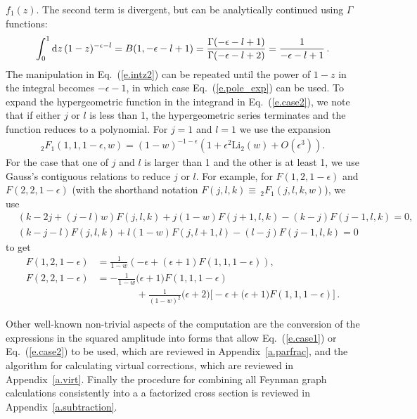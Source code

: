 \documentclass[prd,preprintnumbers,nofootinbib,superscriptaddress,onecolumn,preprint]{revtex4-1}
\newcommand\3[1]{\boldsymbol{#1}}
\newcommand{\eref}[1]{Eq.~(\ref{e.#1})}
\newcommand{\aref}[1]{Appendix~\ref{a.#1}}
\begin{document}
\begin{itemize}
	$f_1(z)$. The second term is divergent, but can be analytically
	continued using $\Gamma$ functions:
	\begin{align}
	\int_0^1\di{z} (1-z)^{-\epsilon-l}=B(1,-\epsilon-l+1)
	=\frac{\Gamma(-\epsilon-l+1)}
	{\Gamma(-\epsilon-l+2)}=\frac{1}{-\epsilon-l+1} \, .
	\end{align}
	The manipulation in \eref{intz2} can be repeated until the power of
	$1-z$ in the integral becomes $-\epsilon-1$, in which case
	\eref{pole_exp} can be used. To expand the hypergeometric function in
	the integrand in \eref{case2}, we note that if either $j$ or $l$ is
	less than 1, the hypergeometric series terminates and the function
	reduces to a polynomial. For $j=1$ and $l=1$ we use the expansion
	\begin{align}
	_2F_1(1,1,1-\epsilon,w)=(1-w)^{-1-\epsilon}(1+\epsilon^2 \text{Li}_2(w)+O(\epsilon^3)).
	\end{align}
	For the case that one of $j$ and $l$ is larger than 1 and the other
	is at least 1, we use Gauss's contiguous relations to reduce $j$ or
	$l$.  For example, for $F(1,2,1-\epsilon)$ and $F(2,2,1-\epsilon)$
	(with the shorthand notation $F(j,l,k)\equiv \,_2F_1(j,l,k,w)$), we use
	\begin{align}
	&(k-2j+(j-l)w)F(j,l,k)+j(1-w)F(j+1,l,k)-(k-j)F(j-1,l,k)=0, \\
	&(k-j-l)F(j,l,k)+l(1-w)F(j,l+1,l)-(l-j)F(j-1,l,k)=0 
	\end{align}
	to get
	\begin{align}
	F(1,2,1-\epsilon)&=\frac{1}{1-w}\left
	(-\epsilon+\left ( \epsilon+1\right
	)F(1,1,1-\epsilon)  \right ), \\
	F(2,2,1-\epsilon)&= -\frac{1}{1-w}\biggl (\epsilon+1 \biggr )
	F(1,1,1-\epsilon) \nonumber \\
	&\qquad \qquad +\frac{1}{(1-w)^2}\biggl (\epsilon+2\biggr )
	\biggl [-\epsilon+\biggl (\epsilon+1 \biggr)F(1,1,1-\epsilon) \biggr ] \, .
	\end{align}
	
\end{itemize}

Other well-known non-trivial aspects of the computation are the 
conversion of the expressions in the squared amplitude
into forms that allow \eref{case1} or \eref{case2} to be used, which are reviewed in 
\aref{parfrac}, and the algorithm for calculating virtual corrections, which are reviewed 
in \aref{virt}. Finally the procedure for combining all Feynman graph calculations 
consistently into a a factorized cross section is reviewed in \aref{subtraction}.
\end{document}
